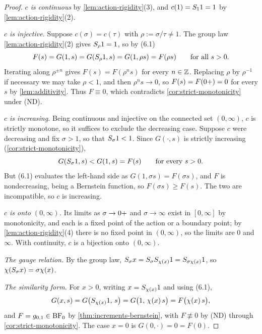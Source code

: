 \begin{proof}
\leanok
\emph{$c$ is continuous} by \ref{lem:action-rigidity}(3), and $c(1) = S_1 1 = 1$ by
\ref{lem:action-rigidity}(2).

\emph{$c$ is injective.} Suppose $c(\sigma) = c(\tau)$ with $\rho := \sigma/\tau \ne 1$. The
group law \ref{lem:action-rigidity}(2) gives $S_\rho 1 = 1$, so by (6.1)
\[
  F(s) = G(1,s) = G(S_\rho 1, s) = G(1, \rho s) = F(\rho s)
  \qquad \text{for all } s > 0 .
\]
Iterating along $\rho^{\pm n}$ gives $F(s) = F(\rho^n s)$ for every $n \in \mathbb{Z}$. Replacing
$\rho$ by $\rho^{-1}$ if necessary we may take $\rho < 1$, and then $\rho^n s \to 0$, so
$F(s) = F(0{+}) = 0$ for every $s$ by \ref{lem:additivity}. Thus $F \equiv 0$, which
contradicts \ref{cor:strict-monotonicity} under (ND).

\emph{$c$ is increasing.} Being continuous and injective on the connected set $(0,\infty)$,
$c$ is strictly monotone, so it suffices to exclude the decreasing case. Suppose $c$ were
decreasing and fix $\sigma > 1$, so that $S_\sigma 1 < 1$. Since $G(\cdot, s)$ is strictly
increasing (\ref{cor:strict-monotonicity}),
\[
  G(S_\sigma 1, s) < G(1,s) = F(s) \qquad \text{for every } s > 0 .
\]
But (6.1) evaluates the left-hand side as $G(1,\sigma s) = F(\sigma s)$, and $F$ is
nondecreasing, being a Bernstein function, so $F(\sigma s) \ge F(s)$. The two are
incompatible, so $c$ is increasing.

\emph{$c$ is onto $(0,\infty)$.} Its limits as $\sigma \to 0{+}$ and $\sigma \to \infty$ exist
in $[0,\infty]$ by monotonicity, and each is a fixed point of the action or a boundary point;
by \ref{lem:action-rigidity}(4) there is no fixed point in $(0,\infty)$, so the limits are $0$
and $\infty$. With continuity, $c$ is a bijection onto $(0,\infty)$.

\emph{The gauge relation.} By the group law, $S_\sigma x = S_\sigma S_{\chi(x)} 1
= S_{\sigma\chi(x)} 1$, so $\chi(S_\sigma x) = \sigma\chi(x)$.

\emph{The similarity form.} For $x > 0$, writing $x = S_{\chi(x)} 1$ and using (6.1),
\[
  G(x, s) = G\bigl(S_{\chi(x)} 1,\, s\bigr) = G\bigl(1,\, \chi(x)\, s\bigr)
  = F\bigl(\chi(x)\,s\bigr),
\]
and $F = g_{0,1} \in \mathrm{BF}_0$ by \ref{thm:increments-bernstein}, with $F \not\equiv 0$ by (ND)
through \ref{cor:strict-monotonicity}. The case $x = 0$ is $G(0,\cdot) = 0 = F(0)$.
\end{proof}

